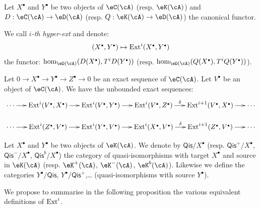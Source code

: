 Let $X^\bullet$ and $Y^\bullet$ be two objects of $\eC(\cA)$ (resp. $\eK(\cA)$)
and $D:\eC(\cA) \to \eD(\cA)$ (resp. $Q:\eK(\cA) \to \eD(\cA)$) the canonical
functor. 





\begin{definition}\label{VIII:3-2-1}
We call \emph{$i$-th hyper-ext} and denote: 
\[
  (X^\bullet,Y^\bullet)\mapsto \ext^i(X^\bullet,Y^\bullet) 
\]
the functor: $\hom_{\eD(\cA)}(D(X^\bullet),T^i D(Y^\bullet))$ (resp.
$\hom_{\eD(\cA)}(Q(X^\bullet),T^i Q(Y^\bullet))$). 
\end{definition}





\begin{proposition}\label{VIII:3-2-2}
Let $0 \to X^\bullet \to Y^\bullet \to Z^\bullet \to 0$ be an exact sequence of
$\eC(\cA)$. Let $V^\bullet$ be an object of $\eC(\cA)$. We have the unbounded
exact sequences: 
\[\xymatrix@=0.5cm{
  \cdots \ar[r] 
    & \ext^i(V^\bullet,X^\bullet) \ar[r] 
    & \ext^i(V^\bullet,Y^\bullet) \ar[r] 
    & \ext^i(V^\bullet,Z^\bullet) \ar[r]^-\delta 
    & \ext^{i+1}(V^\bullet,X^\bullet) \ar[r] 
    & \cdots \\
  \cdots \ar[r] 
    & \ext^i(Z^\bullet,V^\bullet) \ar[r] 
    & \ext^i(Y^\bullet,V^\bullet) \ar[r] 
    & \ext^i(X^\bullet,V^\bullet) \ar[r]^-\delta 
    & \ext^{i+1}(Z^\bullet,V^\bullet) \ar[r] 
    & \cdots
}\]
\end{proposition}

Let $X^\bullet$ and $Y^\bullet$ be two objects of $\eK(\cA)$. We denote by
$\mathsf{Qis}/X^\bullet$ (resp. $\mathsf{Qis}^+/X^\bullet$,
$\mathsf{Qis}^-/X^\bullet$, $\mathsf{Qis}^b/X^\bullet$) the category of
quasi-isomorphisms with target $X^\bullet$ and source in $\eK(\cA)$ (resp.
$\eK^+(\cA)$, $\eK^-(\cA)$, $\eK^b(\cA)$). Likewise we define the
categories $Y^\bullet/\mathsf{Qis}$, $Y^\bullet/\mathsf{Qis}^+$,\ldots
(quasi-isomorphisms with source $Y^\bullet$).

We propose to summarise in the following proposition the various
equivalent definitions of $\operatorname{Ext}^i$. 





